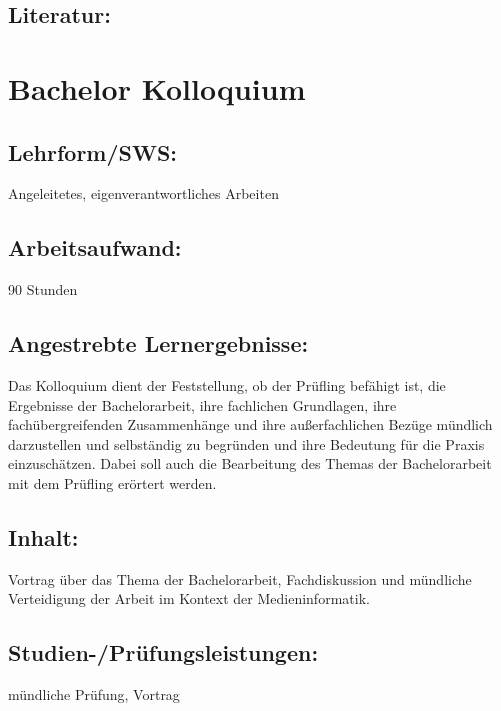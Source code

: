 \section{Literatur:}\label{literatur-3}

\chapter{Bachelor Kolloquium}\label{bachelor-kolloquium}

\section{Lehrform/SWS:}\label{lehrformsws-4}

Angeleitetes, eigenverantwortliches Arbeiten

\section{Arbeitsaufwand:}\label{arbeitsaufwand-4}

90 Stunden

\section{Angestrebte
Lernergebnisse:}\label{angestrebte-lernergebnisse-4}

Das Kolloquium dient der Feststellung, ob der Prüfling befähigt ist, die
Ergebnisse der Bachelorarbeit, ihre fachlichen Grundlagen, ihre
fachübergreifenden Zusammenhänge und ihre außerfachlichen Bezüge
mündlich darzustellen und selbständig zu begründen und ihre Bedeutung
für die Praxis einzuschätzen. Dabei soll auch die Bearbeitung des Themas
der Bachelorarbeit mit dem Prüfling erörtert werden.

\section{Inhalt:}\label{inhalt-4}

Vortrag über das Thema der Bachelorarbeit, Fachdiskussion und mündliche
Verteidigung der Arbeit im Kontext der Medieninformatik.

\section{Studien-/Prüfungsleistungen:}\label{studien-pruxfcfungsleistungen-4}

mündliche Prüfung, Vortrag

